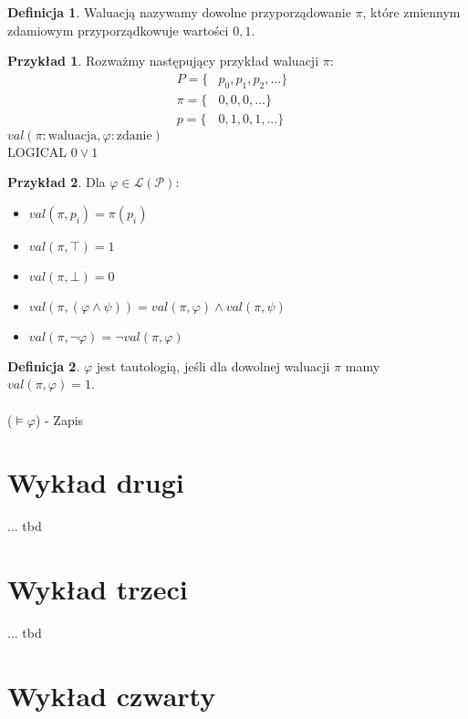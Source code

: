\documentclass{article}
\theoremstyle{definition}
\newtheorem{de}{Definicja}[subsection]
\theoremstyle{definition}
\theoremstyle{definition}
\newtheorem{pk}{Przykład}[subsection]
\theoremstyle{definition}
\begin{document}
\begin{de}
    Waluacją nazywamy dowolne przyporządowanie $\pi$, które zmiennym zdamiowym przyporządkowuje wartości $0,1$.
\end{de}

\begin{pk}
    Rozważmy następujący przykład waluacji $\pi$:
    \begin{align*}
        P=\{&p_0,p_1,p_2,...\}&\\
        \pi=\{&0,0,0,...\}&\\
        p=\{&0,1,0,1,...\}&
    \end{align*}
    $val(\pi: \text{waluacja}, \varphi: \text{zdanie})$\\
    LOGICAL $0 \lor 1$
\end{pk}

\begin{pk}
Dla $\varphi \in \mathcal{L}(\mathcal{P})$:
\begin{itemize}
    \item $val(\pi, p_i)=\pi(p_i)$
    \item $val(\pi, \top)=1$
    \item $val(\pi, \bot)=0$
    \item $val(\pi, (\varphi \land \psi))=val(\pi, \varphi)\land val(\pi, \psi)$
    \item $val(\pi, \neg \varphi)=\neg val(\pi, \varphi)$
\end{itemize}
\end{pk}

\begin{de}
    $\varphi$ jest tautologią, jeśli dla dowolnej waluacji $\pi$ mamy $val(\pi, \varphi)=1$.
    \\\\($\models \varphi$) - Zapis
\end{de}

\section{Wykład drugi}
... tbd

\section{Wykład trzeci}
... tbd

\section{Wykład czwarty}
\end{document}
